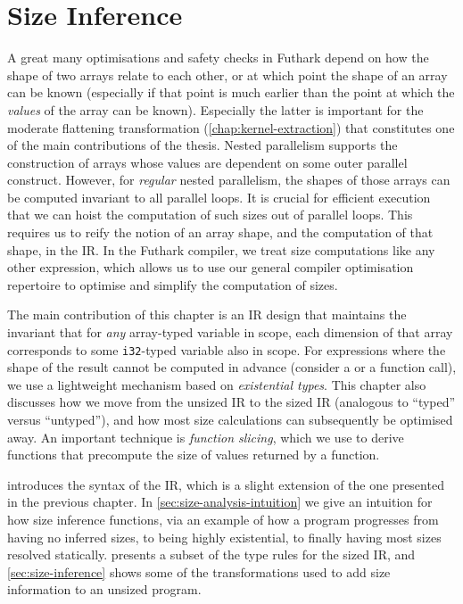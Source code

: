 \chapter{Size Inference}
\label{chap:size-analysis}

A great many optimisations and safety checks in Futhark depend on how
the shape of two arrays relate to each other, or at which point the
shape of an array can be known (especially if that point is much
earlier than the point at which the \textit{values} of the array can
be known).  Especially the latter is important for the moderate
flattening transformation (\cref{chap:kernel-extraction}) that
constitutes one of the main contributions of the thesis.  Nested
parallelism supports the construction of arrays whose values are
dependent on some outer parallel construct.  However, for
\textit{regular} nested parallelism, the shapes of those arrays can be
computed invariant to all parallel loops.  It is crucial for efficient
execution that we can hoist the computation of such sizes out of
parallel loops.  This requires us to reify the notion of an array
shape, and the computation of that shape, in the IR.  In the Futhark
compiler, we treat size computations like any other expression, which
allows us to use our general compiler optimisation repertoire to
optimise and simplify the computation of sizes.

The main contribution of this chapter is an IR design that maintains
the invariant that for \textit{any} array-typed variable in scope,
each dimension of that array corresponds to some \lstinline{i32}-typed
variable also in scope.  For expressions where the shape of the result
cannot be computed in advance (consider a  or a function
call), we use a lightweight mechanism based on \textit{existential
  types}.  This chapter also discusses how we move from the unsized IR
to the sized IR (analogous to ``typed'' versus ``untyped''), and how
most size calculations can subsequently be optimised away.  An
important technique is \textit{function slicing}, which we use to
derive functions that precompute the size of values returned by a
function.

 introduces the syntax of the IR, which is a slight
extension of the one presented in the previous chapter.  In
\cref{sec:size-analysis-intuition} we give an intuition for how size
inference functions, via an example of how a program progresses from
having no inferred sizes, to being highly existential, to finally
having most sizes resolved statically.  
presents a subset of the type rules for the sized IR, and
\cref{sec:size-inference} shows some of the transformations used to
add size information to an unsized program.


